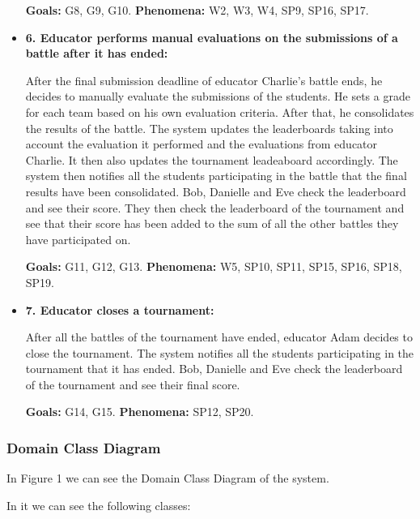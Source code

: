 \documentclass{article}
\begin{document}
\begin{itemize}
    \textbf{Goals:} G8, G9, G10.
    \textbf{Phenomena:} W2, W3, W4, SP9, SP16, SP17.

    \item \textbf{6. Educator performs manual evaluations on the submissions of a battle after it has ended:}
    
    After the final submission deadline of educator Charlie's battle ends, he decides to manually evaluate the submissions of the students. He sets a grade for each team based on his own evaluation criteria. After that, he consolidates the results of the battle. The system updates the leaderboards taking into account the evaluation it performed and the evaluations from educator Charlie. It then also updates the tournament leadeaboard accordingly. The system then notifies all the students participating in the battle that the final results have been consolidated. Bob, Danielle and Eve check the leaderboard and see their score. They then check the leaderboard of the tournament and see that their score has been added to the sum of all the other battles they have participated on.

    \textbf{Goals:} G11, G12, G13.
    \textbf{Phenomena:} W5, SP10, SP11, SP15, SP16, SP18, SP19.

    \item \textbf{7. Educator closes a tournament:}
    
    After all the battles of the tournament have ended, educator Adam decides to close the tournament. The system notifies all the students participating in the tournament that it has ended. Bob, Danielle and Eve check the leaderboard of the tournament and see their final score.

    \textbf{Goals:} G14, G15.
    \textbf{Phenomena:} SP12, SP20.


\end{itemize}
\newpage
\subsubsection{Domain Class Diagram}

In Figure 1 we can see the Domain Class Diagram of the system.

In it we can see the following classes:
\end{document}
